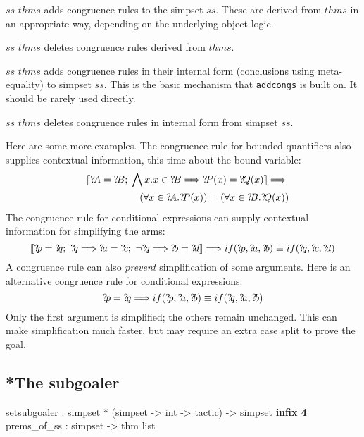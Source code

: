 \begin{ttdescription}
  
\item[$ss$ \ttindexbold{addcongs} $thms$] adds congruence rules to the
  simpset $ss$.  These are derived from $thms$ in an appropriate way,
  depending on the underlying object-logic.
  
\item[$ss$ \ttindexbold{delcongs} $thms$] deletes congruence rules
  derived from $thms$.
  
\item[$ss$ \ttindexbold{addeqcongs} $thms$] adds congruence rules in
  their internal form (conclusions using meta-equality) to simpset
  $ss$.  This is the basic mechanism that \texttt{addcongs} is built
  on.  It should be rarely used directly.
  
\item[$ss$ \ttindexbold{deleqcongs} $thms$] deletes congruence rules
  in internal form from simpset $ss$.
  
\end{ttdescription}

\medskip

Here are some more examples.  The congruence rule for bounded
quantifiers also supplies contextual information, this time about the
bound variable:
\begin{eqnarray*}
  &&\List{\Var{A}=\Var{B};\; 
          \Forall x. x\in \Var{B} \Imp \Var{P}(x) = \Var{Q}(x)} \Imp{} \\
 &&\qquad\qquad
    (\forall x\in \Var{A}.\Var{P}(x)) = (\forall x\in \Var{B}.\Var{Q}(x))
\end{eqnarray*}
The congruence rule for conditional expressions can supply contextual
information for simplifying the arms:
\[ \List{\Var{p}=\Var{q};~ \Var{q} \Imp \Var{a}=\Var{c};~
         \neg\Var{q} \Imp \Var{b}=\Var{d}} \Imp
   if(\Var{p},\Var{a},\Var{b}) \equiv if(\Var{q},\Var{c},\Var{d})
\]
A congruence rule can also {\em prevent\/} simplification of some arguments.
Here is an alternative congruence rule for conditional expressions:
\[ \Var{p}=\Var{q} \Imp
   if(\Var{p},\Var{a},\Var{b}) \equiv if(\Var{q},\Var{a},\Var{b})
\]
Only the first argument is simplified; the others remain unchanged.
This can make simplification much faster, but may require an extra case split
to prove the goal.  


\subsection{*The subgoaler}\label{sec:simp-subgoaler}
\begin{ttbox}
setsubgoaler : simpset *  (simpset -> int -> tactic) -> simpset \hfill{\bf infix 4}
prems_of_ss  : simpset -> thm list
\end{ttbox}

